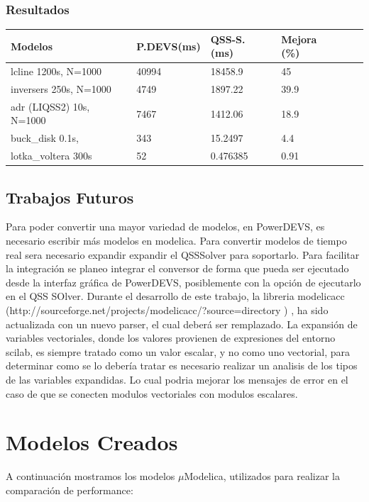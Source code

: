 \documentclass[a4paper,	11pt]{report}
\begin{document}
\subsection{Resultados}
\begin{table}[H]
\centering	
\label{my-label}
\begin{tabular}{llllll}
\toprule
{\bf Modelos}            &  {\bf P.DEVS(ms)} & {\bf QSS-S. (ms)} & {\bf Mejora (\%)} \\
\toprule
lcline 1200s, N=1000     & 40994         & 18458.9         & 45          \\
inversers 250s, N=1000   & 4749          & 1897.22         & 39.9        \\
adr (LIQSS2) 10s, N=1000 & 7467          & 1412.06         & 18.9        \\
buck\_disk  0.1s,        & 343           & 15.2497         & 4.4         \\
lotka\_voltera 300s      & 52            & 0.476385        & 0.91
\end{tabular}
\end{table}

\section{Trabajos Futuros}
Para poder convertir una mayor variedad de modelos, en PowerDEVS, es necesario escribir más modelos en modelica.
Para convertir modelos de tiempo real sera necesario expandir expandir el QSSSolver para soportarlo.
Para facilitar la integración se planeo integrar el conversor de forma que pueda ser ejecutado desde la interfaz gráfica de PowerDEVS, posiblemente con la opción de ejecutarlo en el QSS SOlver.
Durante el desarrollo de este trabajo, la libreria modelicacc (http://sourceforge.net/projects/modelicacc/?source=directory ) , ha sido actualizada con un nuevo parser, el cual deberá ser remplazado.
La expansión de variables vectoriales, donde los valores provienen de expresiones del entorno scilab, es siempre tratado como un valor escalar, y no como uno vectorial, para determinar como se lo debería tratar es necesario realizar un analisis de los tipos de las variables expandidas. Lo cual podria mejorar los mensajes de error en el caso de que se conecten modulos vectoriales con modulos escalares.

\appendix
\chapter{Modelos Creados}
A continuación mostramos los modelos $\mu$Modelica, utilizados para realizar la comparación de performance:
\end{document}
